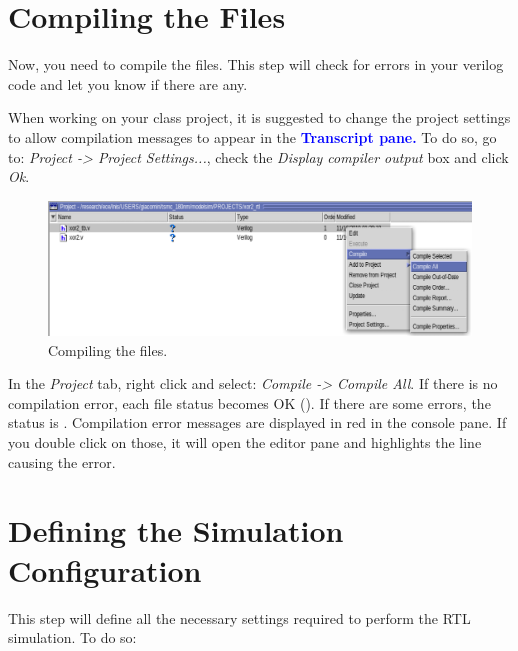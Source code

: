 \section{Compiling the Files}
Now, you need to compile the files. This step will check for errors in your verilog code and let you know if there are any.

\begin{remark}
When working on your class project, it is suggested to change the project settings to allow compilation messages to appear in the \textbf{\textcolor{blue}{Transcript pane.}} To do so, go to: \textit{Project -> Project Settings...}, check the \textit{Display compiler output} box and click \textit{Ok}.
\end{remark}

	\parbox[t]{\dimexpr\textwidth-\leftmargin}{%
	\begin{figure}
		\vspace{0mm}
		\centering
		\vspace{-\baselineskip}
	\includegraphics[scale=0.35]{figures/modelsim/compile}
	\caption{Compiling the files.}
\label{compile}
	\end{figure}
In the \textit{Project} tab, right click and select: \textit{Compile -> Compile All}. \newline
If there is no compilation error, each file status becomes OK (). If there are some errors, the status is . Compilation error messages are displayed in red in the console pane. If you double click on those, it will open the editor pane and highlights the line causing the error.
}
\clearpage
\section{Defining the Simulation Configuration}
This step will define all the necessary settings required to perform the RTL simulation. To do so:


